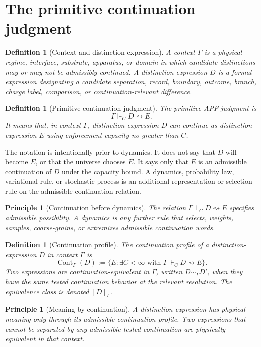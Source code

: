 \documentclass[11pt]{article}
\newtheorem{definition}[theorem]{Definition}
\newtheorem{principle}[theorem]{Principle}
\theoremstyle{remark}
\newcommand{\G}{\Gamma}
\newcommand{\entails}{\Vdash}
\newcommand{\goes}{\rightsquigarrow}
\newcommand{\Cont}{\operatorname{Cont}}
\begin{document}
\section{The primitive continuation judgment}

\begin{definition}[Context and distinction-expression]
A \emph{context} \(\G\) is a physical regime, interface, substrate, apparatus, or domain in which candidate distinctions may or may not be admissibly continued.  A \emph{distinction-expression} \(D\) is a formal expression designating a candidate separation, record, boundary, outcome, branch, charge label, comparison, or continuation-relevant difference.
\end{definition}

\begin{definition}[Primitive continuation judgment]
The primitive APF judgment is
\[
        \G\entails_C D\goes E.
\]
It means that, in context \(\G\), distinction-expression \(D\) can continue as distinction-expression \(E\) using enforcement capacity no greater than \(C\).
\end{definition}

The notation is intentionally prior to dynamics.  It does not say that \(D\) will become \(E\), or that the universe chooses \(E\).  It says only that \(E\) is an admissible continuation of \(D\) under the capacity bound.  A dynamics, probability law, variational rule, or stochastic process is an additional representation or selection rule on the admissible continuation relation.

\begin{principle}[Continuation before dynamics]
The relation \(\G\entails_C D\goes E\) specifies admissible possibility.  A dynamics is any further rule that selects, weights, samples, coarse-grains, or extremizes admissible continuation words.
\end{principle}

\begin{definition}[Continuation profile]
The continuation profile of a distinction-expression \(D\) in context \(\G\) is
\[
        \Cont_\G(D):=\{E:\exists C<\infty\text{ with }\G\entails_C D\goes E\}.
\]
Two expressions are continuation-equivalent in \(\G\), written \(D\sim_\G D'\), when they have the same tested continuation behavior at the relevant resolution.  The equivalence class is denoted \([D]_\G\).
\end{definition}

\begin{principle}[Meaning by continuation]
A distinction-expression has physical meaning only through its admissible continuation profile.  Two expressions that cannot be separated by any admissible tested continuation are physically equivalent in that context.
\end{principle}
\end{document}
